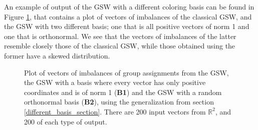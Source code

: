 \documentclass[12pt]{article}
\begin{document}
An example of output of the GSW with a different coloring basis can be found in Figure \ref{3types_basis_200_2}, that contains a plot of vectors of imbalances of the classical GSW, and the GSW with two different basis; one that is all positive vectors of norm 1 and one that is orthonormal. We see that the vectors of imbalances of the latter resemble closely those of the classical GSW, while those obtained using the former have a skewed distribution. 
\begin{figure}[h!]

\caption{Plot of vectors of imbalances of group assignments from the GSW, the GSW with a basis where every vector has only positive coordinates and is of norm 1 (\textbf{B1}) and the GSW with a random orthonormal basis (\textbf{B2}), using the generalization from section \ref{different_basis_section}. There are 200 input vectors from $\mathbb{R}^2$, and 200 of each type of output. }\label{3types_basis_200_2}
\end{figure}
\end{document}
